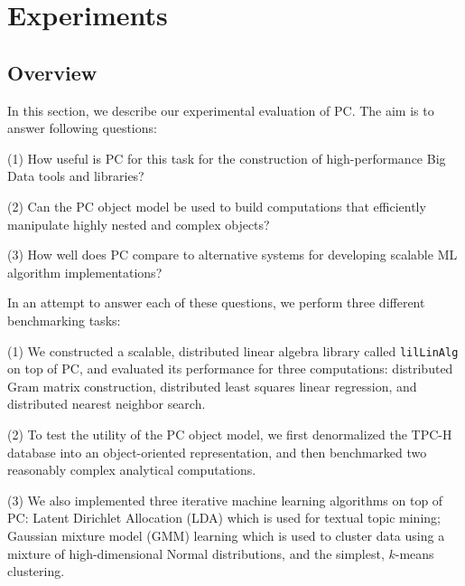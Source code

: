 
\section{Experiments}

\subsection{Overview}

In this section, we describe our experimental evaluation of PC.
The aim is to answer
following questions:

\vspace{5pt}
\noindent
(1) How useful is PC for this task for the construction of high-performance Big Data tools and libraries?

\vspace{2pt}
\noindent
(2) Can the PC object model be used to build 
computations that efficiently manipulate highly nested and complex objects?

\vspace{2pt}
\noindent
(3) How well does PC compare to alternative systems for developing scalable ML algorithm implementations?

\vspace{5pt}

\noindent In an attempt to answer each of these questions, we perform three different benchmarking tasks:

\vspace{5pt}
\noindent
(1) We constructed a scalable, distributed
linear algebra library
called \texttt{lilLinAlg} on top of PC, and evaluated its performance for three
computations: distributed Gram matrix construction, 
distributed least squares linear regression, and distributed nearest neighbor search.

\vspace{2pt}
\noindent
(2) To test the utility of the PC object model, we first denormalized the TPC-H database \cite{council2008tpc} into an object-oriented 
representation, and then benchmarked two reasonably complex 
analytical computations.

\vspace{2pt}
\noindent
(3) We also implemented three
  iterative machine learning algorithms on top of PC: Latent Dirichlet Allocation (LDA) which is used for
  textual topic mining;
  Gaussian mixture model (GMM) learning which is used to cluster data using a mixture of high-dimensional Normal
  distributions, and the simplest, $k$-means clustering.


